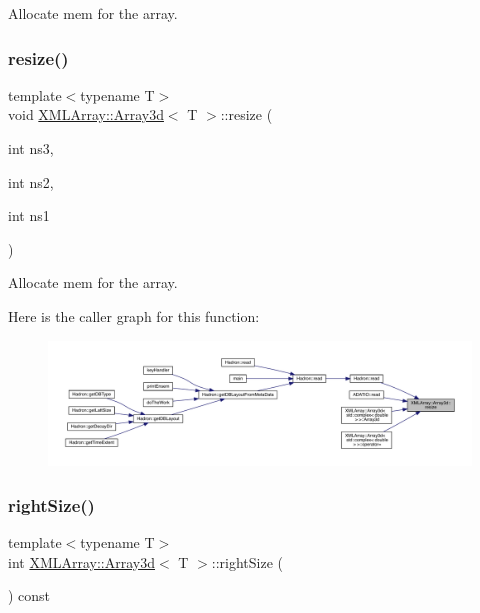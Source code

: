 Allocate mem for the array. 

\mbox{\label{classXMLArray_1_1Array3d_afe27b06ef40efdd87dbea00eafa35287}} 
\subsubsection{\texorpdfstring{resize()}{resize()}\hspace{0.1cm}{\footnotesize\ttfamily [2/2]}}
{\footnotesize\ttfamily template$<$typename T$>$ \\
void \mbox{\hyperlink{classXMLArray_1_1Array3d}{X\+M\+L\+Array\+::\+Array3d}}$<$ T $>$\+::resize (\begin{DoxyParamCaption}\item[{int}]{ns3,  }\item[{int}]{ns2,  }\item[{int}]{ns1 }\end{DoxyParamCaption})\hspace{0.3cm}{\ttfamily [inline]}}



Allocate mem for the array. 

Here is the caller graph for this function\+:\nopagebreak
\begin{figure}[H]
\begin{center}
\leavevmode
\includegraphics[width=350pt]{db/da0/classXMLArray_1_1Array3d_afe27b06ef40efdd87dbea00eafa35287_icgraph}
\end{center}
\end{figure}
\mbox{\label{classXMLArray_1_1Array3d_a19c4d18fb2ee0f0ee27631f0aa35ccdc}} 
\subsubsection{\texorpdfstring{rightSize()}{rightSize()}\hspace{0.1cm}{\footnotesize\ttfamily [1/2]}}
{\footnotesize\ttfamily template$<$typename T$>$ \\
int \mbox{\hyperlink{classXMLArray_1_1Array3d}{X\+M\+L\+Array\+::\+Array3d}}$<$ T $>$\+::right\+Size (\begin{DoxyParamCaption}{ }\end{DoxyParamCaption}) const\hspace{0.3cm}{\ttfamily [inline]}}

